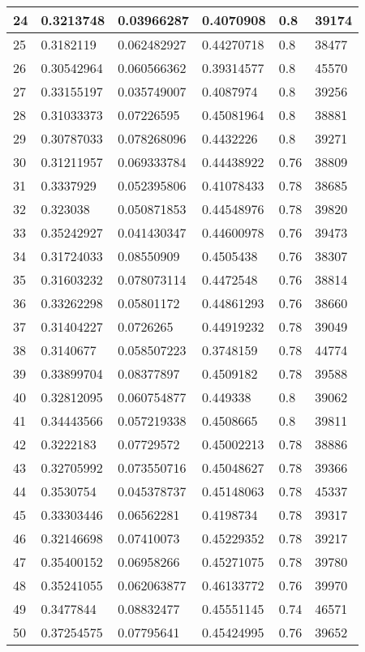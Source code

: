 \begin{longtable}{|l|l|l|l|l|l|}
24 & 0.3213748 & 0.03966287 & 0.4070908 & 0.8 & 39174 \\ \hline 
25 & 0.3182119 & 0.062482927 & 0.44270718 & 0.8 & 38477 \\ \hline 
26 & 0.30542964 & 0.060566362 & 0.39314577 & 0.8 & 45570 \\ \hline 
27 & 0.33155197 & 0.035749007 & 0.4087974 & 0.8 & 39256 \\ \hline 
28 & 0.31033373 & 0.07226595 & 0.45081964 & 0.8 & 38881 \\ \hline 
29 & 0.30787033 & 0.078268096 & 0.4432226 & 0.8 & 39271 \\ \hline 
30 & 0.31211957 & 0.069333784 & 0.44438922 & 0.76 & 38809 \\ \hline 
31 & 0.3337929 & 0.052395806 & 0.41078433 & 0.78 & 38685 \\ \hline 
32 & 0.323038 & 0.050871853 & 0.44548976 & 0.78 & 39820 \\ \hline 
33 & 0.35242927 & 0.041430347 & 0.44600978 & 0.76 & 39473 \\ \hline 
34 & 0.31724033 & 0.08550909 & 0.4505438 & 0.76 & 38307 \\ \hline 
35 & 0.31603232 & 0.078073114 & 0.4472548 & 0.76 & 38814 \\ \hline 
36 & 0.33262298 & 0.05801172 & 0.44861293 & 0.76 & 38660 \\ \hline 
37 & 0.31404227 & 0.0726265 & 0.44919232 & 0.78 & 39049 \\ \hline 
38 & 0.3140677 & 0.058507223 & 0.3748159 & 0.78 & 44774 \\ \hline 
39 & 0.33899704 & 0.08377897 & 0.4509182 & 0.78 & 39588 \\ \hline 
40 & 0.32812095 & 0.060754877 & 0.449338 & 0.8 & 39062 \\ \hline 
41 & 0.34443566 & 0.057219338 & 0.4508665 & 0.8 & 39811 \\ \hline 
42 & 0.3222183 & 0.07729572 & 0.45002213 & 0.78 & 38886 \\ \hline 
43 & 0.32705992 & 0.073550716 & 0.45048627 & 0.78 & 39366 \\ \hline 
44 & 0.3530754 & 0.045378737 & 0.45148063 & 0.78 & 45337 \\ \hline 
45 & 0.33303446 & 0.06562281 & 0.4198734 & 0.78 & 39317 \\ \hline 
46 & 0.32146698 & 0.07410073 & 0.45229352 & 0.78 & 39217 \\ \hline 
47 & 0.35400152 & 0.06958266 & 0.45271075 & 0.78 & 39780 \\ \hline 
48 & 0.35241055 & 0.062063877 & 0.46133772 & 0.76 & 39970 \\ \hline 
49 & 0.3477844 & 0.08832477 & 0.45551145 & 0.74 & 46571 \\ \hline 
50 & 0.37254575 & 0.07795641 & 0.45424995 & 0.76 & 39652 \\ \hline 
\end{longtable}